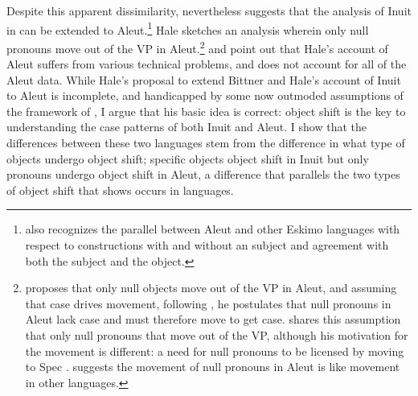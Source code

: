 \documentclass[output=paper]{LSP/langsci}
\begin{document}
Despite this apparent dissimilarity, \citet{hale1997misumalpan} nevertheless suggests that the analysis of Inuit in \citet{bittner1996ergativity} can be extended to Aleut.\footnote{\citet[6]{fortescue1985anaphoric} also recognizes the parallel between Aleut and other Eskimo languages with respect to constructions with and without an  subject and agreement with both the subject and the object.} Hale sketches an analysis wherein only null pronouns move out of the VP in Aleut.\footnote{\citet{hale1997misumalpan} proposes that only null objects move out of the VP in Aleut, and assuming that case drives movement, following \citet{chomsky1995minimalist}, he postulates that null pronouns in Aleut lack case and must therefore move to get case. \citet{boyle2000aleut} shares this assumption that only null pronouns that move out of the VP, although his motivation for the movement is different: a need for null pronouns to be licensed by moving to Spec . \citet{merchant2011aleut} suggests the movement of null pronouns in Aleut is like  movement in other languages.} \citet{sadock2000aleut} and \citet{boyle2000aleut} point out that Hale’s account of Aleut suffers from various technical problems, and does not account for all of the Aleut data. While Hale’s proposal to extend Bittner and Hale’s account of Inuit to Aleut is incomplete, and handicapped by some now outmoded assumptions of the framework of \citet{chomsky1995minimalist}, I argue that his basic idea is correct: object shift is the key to understanding the case patterns of both Inuit and Aleut. I show that the differences between these two languages stem from the difference in what type of objects undergo object shift; specific objects object shift in Inuit but only pronouns undergo object shift in Aleut, a difference that parallels the two types of object shift that \citet{holmberg1986word} shows occurs in  languages. 
\end{document}
